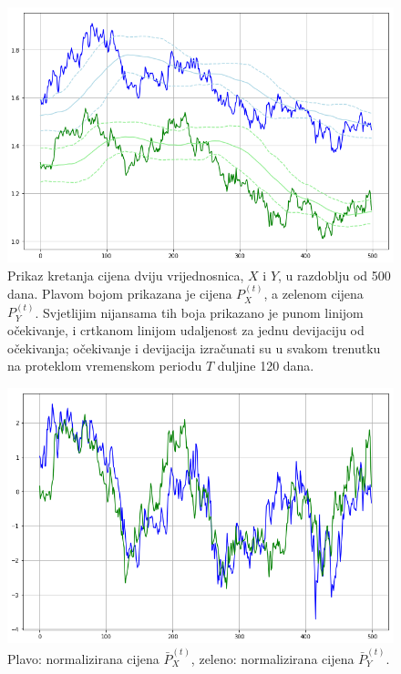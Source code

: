 \documentclass[lmodern, utf8, diplomski, numeric]{fer}
\newcommand{\norm}[1]{\bar{#1}}
\begin{document}
  \begin{figure}[p]
    \centering
    \includegraphics[width=1.0\linewidth]{graphics/ab-prices.png}
    \caption{
      Prikaz kretanja cijena dviju vrijednosnica, $X$ i $Y$, u razdoblju od 500 dana.
      Plavom bojom prikazana je cijena $P_X^{(t)}$, a zelenom cijena $P_Y^{(t)}$.
      Svjetlijim nijansama tih boja prikazano je punom linijom očekivanje, i crtkanom linijom udaljenost za jednu devijaciju od očekivanja; očekivanje i devijacija izračunati su u svakom trenutku na proteklom vremenskom periodu $T$ duljine 120 dana.
    }
    \label{fig:ab-prices}
  \end{figure}

  \begin{figure}[p]
    \centering
    \includegraphics[width=1.0\linewidth]{graphics/ab-prices-norm.png}
    \caption{
      Plavo: normalizirana cijena $\norm{P}_X^{(t)}$, zeleno: normalizirana cijena $\norm{P}_Y^{(t)}$.
    }
    \label{fig:ab-prices-norm}
  \end{figure}
\end{document}
